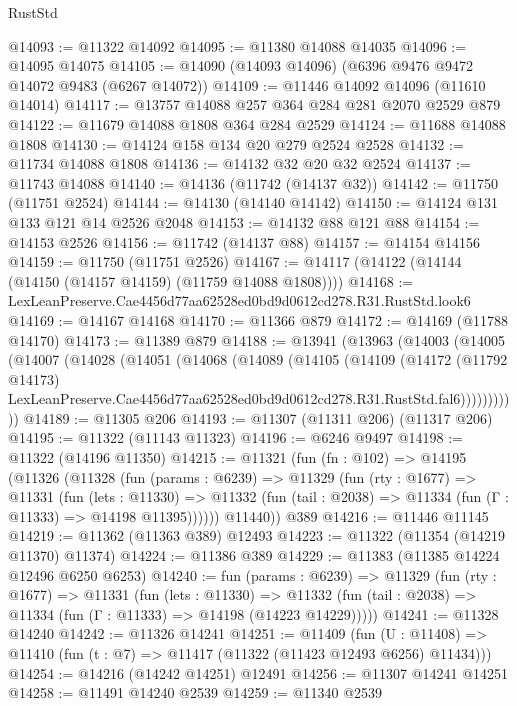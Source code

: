 \begin{lexlean}{RustStd}
\begin{coremodule}
@14093 := @11322 @14092
@14095 := @11380 @14088 @14035
@14096 := @14095 @14075
@14105 := @14090 (@14093 @14096) (@6396 @9476 @9472 @14072 @9483 (@6267 @14072))
@14109 := @11446 @14092 @14096 (@11610 @14014)
@14117 := @13757 @14088 @257 @364 @284 @281 @2070 @2529 @879
@14122 := @11679 @14088 @1808 @364 @284 @2529
@14124 := @11688 @14088 @1808
@14130 := @14124 @158 @134 @20 @279 @2524 @2528
@14132 := @11734 @14088 @1808
@14136 := @14132 @32 @20 @32 @2524
@14137 := @11743 @14088
@14140 := @14136 (@11742 (@14137 @32))
@14142 := @11750 (@11751 @2524)
@14144 := @14130 (@14140 @14142)
@14150 := @14124 @131 @133 @121 @14 @2526 @2048
@14153 := @14132 @88 @121 @88
@14154 := @14153 @2526
@14156 := @11742 (@14137 @88)
@14157 := @14154 @14156
@14159 := @11750 (@11751 @2526)
@14167 := @14117 (@14122 (@14144 (@14150 (@14157 @14159) (@11759 @14088 @1808))))
@14168 := LexLeanPreserve.Cae4456d77aa62528ed0bd9d0612cd278.R31.RustStd.look6
@14169 := @14167 @14168
@14170 := @11366 @879
@14172 := @14169 (@11788 @14170)
@14173 := @11389 @879
@14188 := @13941
    (@13963
      (@14003
        (@14005
          (@14007
            (@14028
              (@14051
                (@14068
                  (@14089
                    (@14105
                      (@14109
                        (@14172
                          (@11792 @14173)
                          LexLeanPreserve.Cae4456d77aa62528ed0bd9d0612cd278.R31.RustStd.fal6)))))))))))
@14189 := @11305 @206
@14193 := @11307 (@11311 @206) (@11317 @206)
@14195 := @11322 (@11143 @11323)
@14196 := @6246 @9497
@14198 := @11322 (@14196 @11350)
@14215 := @11321
    (fun (fn : @102) =>
    @14195
      (@11326
        (@11328
          (fun (params : @6239) =>
          @11329
            (fun (rty : @1677) =>
            @11331
              (fun (lets : @11330) =>
              @11332 (fun (tail : @2038) => @11334 (fun (Γ : @11333) => @14198 @11395))))))
        @11440))
    @389
@14216 := @11446 @11145
@14219 := @11362 (@11363 @389) @12493
@14223 := @11322 (@11354 (@14219 @11370) @11374)
@14224 := @11386 @389
@14229 := @11383 (@11385 @14224 @12496 @6250 @6253)
@14240 := fun (params : @6239) =>
  @11329
    (fun (rty : @1677) =>
    @11331
      (fun (lets : @11330) =>
      @11332 (fun (tail : @2038) => @11334 (fun (Γ : @11333) => @14198 (@14223 @14229)))))
@14241 := @11328 @14240
@14242 := @11326 @14241
@14251 := @11409
    (fun (U : @11408) => @11410 (fun (t : @7) => @11417 (@11322 (@11423 @12493 @6256) @11434)))
@14254 := @14216 (@14242 @14251) @12491
@14256 := @11307 @14241 @14251
@14258 := @11491 @14240 @2539
@14259 := @11340 @2539

\end{coremodule}
\end{lexlean}
